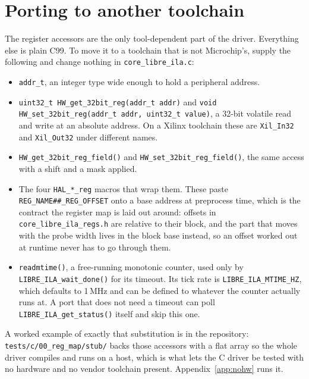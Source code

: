 \documentclass[../manual.tex]{subfiles}
\begin{document}
\section{Porting to another toolchain}
\label{sec:c_porting}

The register accessors are the only tool-dependent part of the driver. Everything else is plain C99. To move it to a toolchain that is not Microchip's, supply the following and change nothing in \texttt{core\_libre\_ila.c}:

\begin{itemize}
    \item \texttt{addr\_t}, an integer type wide enough to hold a peripheral address.
    \item \texttt{uint32\_t HW\_get\_32bit\_reg(addr\_t addr)} and \texttt{void HW\_set\_32bit\_reg(addr\_t addr, uint32\_t value)}, a 32-bit volatile read and write at an absolute address. On a Xilinx toolchain these are \texttt{Xil\_In32} and \texttt{Xil\_Out32} under different names.
    \item \texttt{HW\_get\_32bit\_reg\_field()} and \texttt{HW\_set\_32bit\_reg\_field()}, the same access with a shift and a mask applied.
    \item The four \texttt{HAL\_*\_reg} macros that wrap them. These paste \texttt{REG\_NAME\#\#\_REG\_OFFSET} onto a base address at preprocess time, which is the contract the register map is laid out around: offsets in \texttt{core\_libre\_ila\_regs.h} are relative to their block, and the part that moves with the probe width lives in the block base instead, so an offset worked out at runtime never has to go through them.
    \item \texttt{readmtime()}, a free-running monotonic counter, used only by \texttt{LIBRE\_ILA\_wait\_done()} for its timeout. Its tick rate is \texttt{LIBRE\_ILA\_MTIME\_HZ}, which defaults to 1\,MHz and can be defined to whatever the counter actually runs at. A port that does not need a timeout can poll \texttt{LIBRE\_ILA\_get\_status()} itself and skip this one.
\end{itemize}

A worked example of exactly that substitution is in the repository: \texttt{tests/c/00\_reg\_map/stub/} backs those accessors with a flat array so the whole driver compiles and runs on a host, which is what lets the C driver be tested with no hardware and no vendor toolchain present. Appendix~\ref{app:nohw} runs it.
\end{document}
